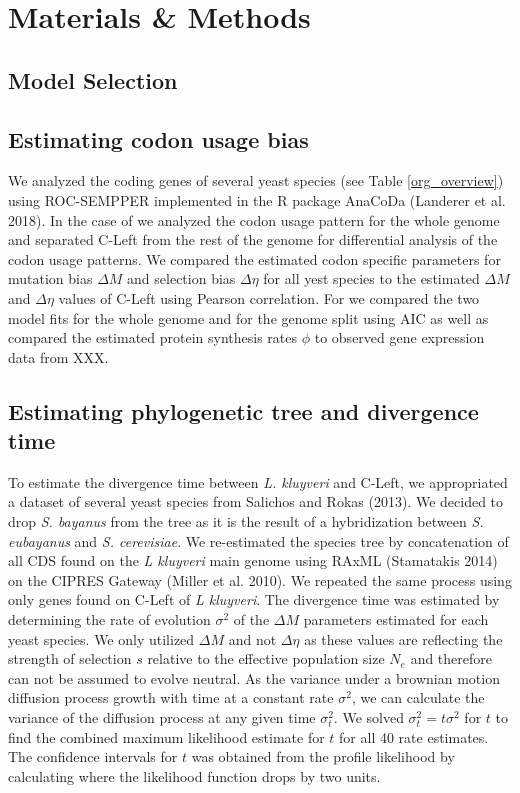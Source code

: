 \documentclass[12pt]{article}
\begin{document}
\section*{Materials \& Methods}

\subsection*{Model Selection}

\subsection*{Estimating codon usage bias}
We analyzed the coding genes of several yeast species (see Table \ref{org_overview}) using ROC-SEMPPER \citep{gilchrist2015} implemented in the R package AnaCoDa (Landerer et al. 2018).
In the case of \kluyveri we analyzed the codon usage pattern for the whole genome and separated C-Left from the rest of the genome for differential analysis of the codon usage patterns.
We compared the estimated codon specific parameters for mutation bias $\Delta M$ and selection bias $\Delta \eta$ for all yest species to the estimated $\Delta M$ and $\Delta \eta$ values of C-Left using Pearson correlation.
For \kluyveri we compared the two model fits for the whole genome and for the genome split using AIC as well as compared the estimated protein synthesis rates $\phi$ to observed gene expression data from XXX.

\subsection*{Estimating phylogenetic tree and divergence time}
To estimate the divergence time between \textit{L. kluyveri} and C-Left, we appropriated a dataset of several yeast species from Salichos and Rokas (2013). 
We decided to drop \textit{S. bayanus} from the tree as it is the result of a hybridization between \textit{S. eubayanus} and \textit{S. cerevisiae}.
We re-estimated the species tree by concatenation of all CDS found on the \textit{L kluyveri} main genome using RAxML (Stamatakis 2014) on the CIPRES Gateway (Miller et al. 2010).
We repeated the same process using only genes found on C-Left of \textit{L kluyveri}.
The divergence time was estimated by determining the rate of evolution $\sigma^2$ of the $\Delta M$ parameters estimated for each yeast species.
We only utilized $\Delta M$ and not $\Delta \eta$ as these values are reflecting the strength of selection $s$ relative to the effective population size $N_e$ and therefore can not be assumed to evolve neutral.
As the variance under a brownian motion diffusion process growth with time at a constant rate $\sigma^2$, we can calculate the variance of the diffusion process at any given time $\sigma^2_t$. 
We solved $\sigma^2_t = t\sigma^2$ for $t$ to find the combined maximum likelihood estimate for $t$ for all 40 rate estimates.
The confidence intervals for $t$ was obtained from the profile likelihood by calculating where the likelihood function drops by two units.
  
\end{document}
